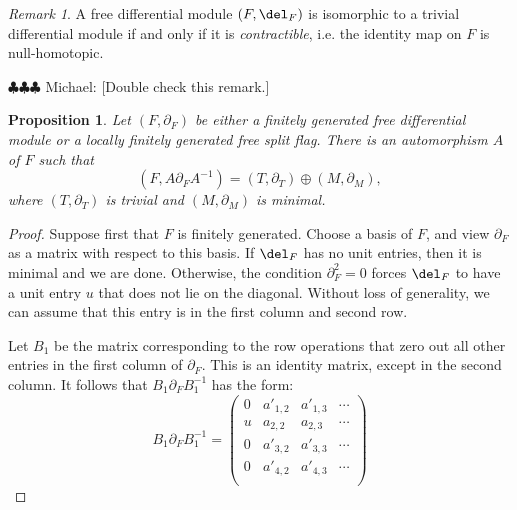 \documentclass[12pt]{amsart}
\newtheorem{prop}[lemma]{Proposition}
\theoremstyle{definition}
\theoremstyle{remark}
\newtheorem{rem}[lemma]{Remark}
\newcommand{\michael}[1]{{\color{red} \sf $\clubsuit\clubsuit\clubsuit$ Michael: [#1]}}
\begin{document}
\begin{rem}
A free differential module $(F, \del_F)$ is isomorphic to a trivial differential module if and only if it is \emph{contractible}, i.e. the identity map on $F$ is null-homotopic. 
\end{rem}
\michael{Double check this remark.}


\begin{prop}
\label{decomp}
Let $(F, \partial_F)$ be either a finitely generated free differential module or a locally finitely generated free split flag. There is an automorphism $A$ of $F$ such that
$$
(F, A\partial_FA^{-1}) =  (T, \partial_T) \oplus (M, \partial_M),
$$
where $(T, \partial_T)$ is trivial and $(M, \partial_M)$ is minimal.
\end{prop}

\begin{proof}
Suppose first that $F$ is finitely generated. Choose a basis of $F$, and view $\partial_F$ as a matrix with respect to this basis. If $\del_F$ has no unit entries, then it is minimal and we are done.  Otherwise, the condition $\partial_F^2 =0$ forces $\del_F$ to have a unit entry $u$ that does not lie on the diagonal. Without loss of generality, we can assume that this entry is in the first column and second row.  
\iffalse
After acting by the diagonal matrix with entries $(1,u^{-1},1,1,\dots)$ we can assume that $u=1$. \michael{I think this isn't allowed. We can't turn $u$ into 1 by conjugating. So our definition of a trivial DM should involve any unit, not just 1.} So we have:
\[
\partial_F = \begin{pmatrix}
a_{1,1}&a_{1,2}&a_{1,3}&\cdots \\
1&a_{2,2}&a_{2,3}&\cdots \\
a_{3,1}&a_{3,2}&a_{3,3}&\cdots\\
a_{4,1}&a_{4,2}&a_{4,3}&\cdots\\
\vdots&\vdots&\vdots&\ddots
\end{pmatrix}
\]
\fi
Let $B_1$ be the matrix corresponding to the row operations that zero out all other entries in the first column of $\partial_F$.  This is an identity matrix, except in the second column.  It follows that $B_1\partial_FB_1^{-1}$ has the form:
\[
B_1\partial_F B_1^{-1}
=
\begin{pmatrix}
0&a'_{1,2}&a'_{1,3}&\cdots \\
u&a_{2,2}&a_{2,3}&\cdots \\
0&a'_{3,2}&a'_{3,3}&\cdots\\
0&a'_{4,2}&a'_{4,3}&\cdots\\

\end{pmatrix}\]
\end{proof}
\end{document}
